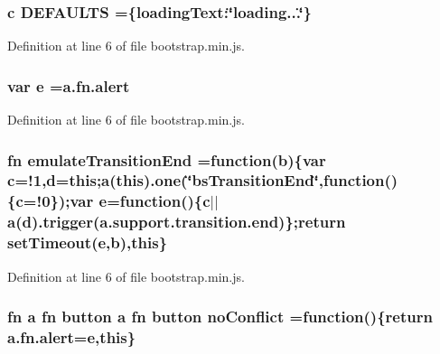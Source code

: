\subsubsection[{D\+E\+F\+A\+U\+L\+T\+S}]{ {\bf c} D\+E\+F\+A\+U\+L\+T\+S =\{loading\+Text\+:\char`\"{}loading...\char`\"{}\}}\label{bootstrap_8min_8js_a6c1cf0be5e5383617ddc5efdfdc8c651}


Definition at line 6 of file bootstrap.\+min.\+js.

\subsubsection[{e}]{\setlength{\rightskip}{0pt plus 5cm}var e ={\bf a.\+fn.\+alert}}\label{bootstrap_8min_8js_ab5902775854a8b8440bcd25e0fe1c120}


Definition at line 6 of file bootstrap.\+min.\+js.

\subsubsection[{emulate\+Transition\+End}]{ {\bf fn} emulate\+Transition\+End =function({\bf b})\{var {\bf c}=!1,{\bf d}={\bf this};{\bf a}({\bf this}).one(\char`\"{}bs\+Transition\+End\char`\"{},function()\{{\bf c}=!0\});var {\bf e}=function()\{{\bf c}$\vert$$\vert${\bf a}({\bf d}).trigger(a.\+support.\+transition.\+end)\};{\bf return} set\+Timeout({\bf e},{\bf b}),{\bf this}\}}\label{bootstrap_8min_8js_a006fe6a2a254572b367123c6db401ff3}


Definition at line 6 of file bootstrap.\+min.\+js.

\subsubsection[{no\+Conflict}]{ {\bf fn} {\bf a} {\bf fn} {\bf button} {\bf a} {\bf fn} {\bf button} no\+Conflict =function()\{{\bf return} {\bf a.\+fn.\+alert}={\bf e},{\bf this}\}}\label{bootstrap_8min_8js_ac26971afe341e4079ee34fceab395fc2}


